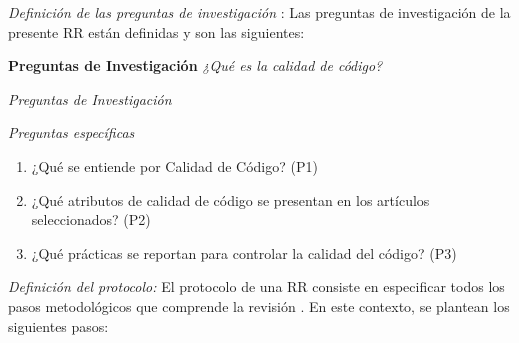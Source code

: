\documentclass[conference]{IEEEtran}
\begin{document}
\textit{Definición de  las preguntas de investigación }: Las preguntas de investigación de la presente RR están definidas y son las siguientes:

\textbf{Preguntas de Investigación}
\textit{¿Qué es la calidad de código?}

\textit{Preguntas de Investigación}

    \textit{Preguntas específicas}
   \begin{enumerate}
   \item  ¿Qué se entiende por Calidad de Código? (P1)
   \item ¿Qué atributos de calidad de código se presentan en los artículos seleccionados? (P2)
    \item ¿Qué prácticas se reportan para controlar la calidad del código? (P3)
   
\end{enumerate}

\textit{ Definición del protocolo:}  El protocolo de una RR consiste en especificar todos los pasos metodológicos que comprende la revisión  \cite{cartaxo2020rapid}.  En este contexto, se plantean los siguientes pasos: 
\end{document}
